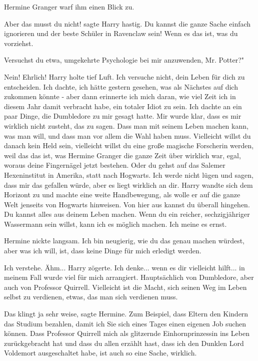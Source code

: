 Hermine Granger warf ihm einen Blick zu.

\glqq{}Aber das musst du nicht!\grqq{} sagte Harry hastig. \glqq{}Du kannst die
ganze Sache einfach ignorieren und der beste Schüler in Ravenclaw sein! Wenn es
das ist, was du vorziehst.\grqq{}

\glqq{}Versuchst du etwa, umgekehrte Psychologie bei mir anzuwenden, Mr. Potter?"

\glqq{}Nein! Ehrlich!\grqq{} Harry holte tief Luft. \glqq{}Ich versuche nicht,
dein Leben für dich zu entscheiden. Ich dachte, ich hätte gestern gesehen, was
als Nächstes auf dich zukommen könnte - aber dann erinnerte ich mich daran, wie
viel Zeit ich in diesem Jahr damit verbracht habe, ein totaler Idiot zu sein.
Ich dachte an ein paar Dinge, die Dumbledore zu mir gesagt hatte. Mir wurde
klar, dass es mir wirklich nicht zusteht, das zu sagen. Dass man mit seinem
Leben machen kann, was man will, und dass man vor allem die Wahl haben muss.
Vielleicht willst du danach kein Held sein, vielleicht willst du eine große
magische Forscherin werden, weil das das ist, was Hermine Granger die ganze Zeit
über wirklich war, egal, woraus deine Fingernägel jetzt bestehen. Oder du gehst
auf das Salemer Hexeninstitut in Amerika, statt nach Hogwarts. Ich werde nicht
lügen und sagen, dass mir das gefallen würde, aber es liegt wirklich an
dir.\grqq{} Harry wandte sich dem Horizont zu und machte eine weite
Handbewegung, als wolle er auf die ganze Welt jenseits von Hogwarts hinweisen.
\glqq{}Von hier aus kannst du überall hingehen. Du kannst alles aus deinem Leben
machen. Wenn du ein reicher, sechzigjähriger Wassermann sein willst, kann ich es
möglich machen. Ich meine es ernst.\grqq{}

Hermine nickte langsam. \glqq{}Ich bin neugierig, wie du das genau machen
würdest, aber was ich will, ist, dass keine Dinge für mich erledigt
werden.\grqq{}

\glqq{}Ich verstehe. Ähm...\grqq{} Harry zögerte. \glqq{}Ich denke... wenn es dir
vielleicht hilft... in meinem Fall wurde viel für mich arrangiert. Hauptsächlich
von Dumbledore, aber auch von Professor Quirrell. Vielleicht ist die Macht, sich
seinen Weg im Leben selbst zu verdienen, etwas, das man sich verdienen
muss.\grqq{}

\glqq{}Das klingt ja sehr weise\grqq{}, sagte Hermine. \glqq{}Zum Beispiel, dass
Eltern den Kindern das Studium bezahlen, damit ich Sie sich eines Tages einen
eigenen Job suchen können. Dass Professor Quirrell mich als glitzernde
Einhornprinzessin ins Leben zurückgebracht hat und dass du allen erzählt hast,
dass ich den Dunklen Lord Voldemort ausgeschaltet habe, ist auch so eine Sache,
wirklich.\grqq{}

